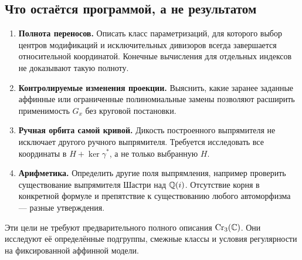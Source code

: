 \subsection{Что остаётся программой, а не результатом}

\begin{enumerate}
\item \textbf{Полнота переносов.} Описать класс параметризаций,
для которого выбор центров модификаций и исключительных дивизоров
всегда завершается относительной координатой. Конечные вычисления
для отдельных индексов не доказывают такую полноту.
\item \textbf{Контролируемые изменения проекции.} Выяснить, какие
заранее заданные аффинные или ограниченные полиномиальные замены
позволяют расширить применимость $G_x$ без круговой постановки.
\item \textbf{Ручная орбита самой кривой.} Дикость построенного
выпрямителя не исключает другого ручного выпрямителя. Требуется
исследовать все координаты в $H+\ker\gamma^*$, а не только выбранную $H$.
\item \textbf{Арифметика.} Определить другие поля выпрямления,
например проверить существование выпрямителя Шастри над ${\mathbb Q}(i)$.
Отсутствие корня в конкретной формуле и препятствие к существованию
любого автоморфизма --- разные утверждения.
\end{enumerate}
Эти цели не требуют предварительного полного описания $\operatorname{Cr}_3({\mathbb C})$.
Они исследуют её определённые подгруппы, смежные классы и условия
регулярности на фиксированной аффинной модели.
